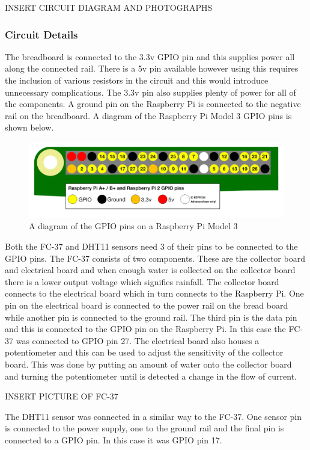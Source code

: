 \documentclass[10pt,a4paper]{article}
\begin{document}
INSERT CIRCUIT DIAGRAM AND PHOTOGRAPHS

\subsubsection{Circuit Details}
The breadboard is connected to the 3.3v GPIO pin and this supplies power all along the connected rail. There is a 5v pin available however using this requires the inclusion of various resistors in the circuit and this would introduce unnecessary complications. The 3.3v pin also supplies plenty of power for all of the components. A ground pin on the Raspberry Pi is connected to the negative rail on the breadboard. A diagram of the Raspberry Pi Model 3 GPIO pins is shown below. 
\begin{figure}[H]
  \centering
    \includegraphics[width=\linewidth]{images/gpio-pins.png}
    \caption{A diagram of the GPIO pins on a Raspberry Pi Model 3}
    \label{fig:gpiopins}
  \end{figure}

Both the FC-37 and DHT11 sensors need 3 of their pins to be connected to the GPIO pins. The FC-37 consists of two components. These are the collector board and electrical board and when enough water is collected on the collector board there is a lower output voltage which signifies rainfall. The collector board connects to the electrical board which in turn connects to the Raspberry Pi. One pin on the electrical board is connected to the power rail on the bread board while another pin is connected to the ground rail. The third pin is the data pin and this is connected to the GPIO pin on the Raspberry Pi. In this case the FC-37 was connected to GPIO pin 27. The electrical board also houses a potentiometer and this can be used to adjust the sensitivity of the collector board. This was done by putting an amount of water onto the collector board and turning the potentiometer until is detected a change in the flow of current.

INSERT PICTURE OF FC-37

The DHT11 sensor was connected in a similar way to the FC-37. One sensor pin is connected to the power supply, one to the ground rail and the final pin is connected to a GPIO pin. In this case it was GPIO pin 17. 
\end{document}
